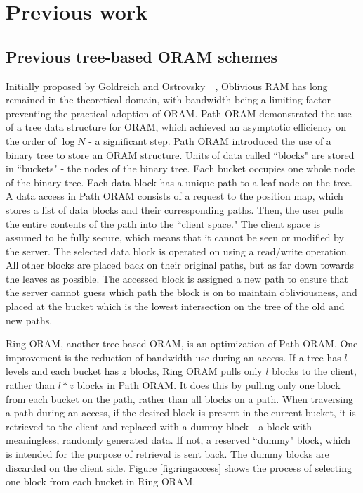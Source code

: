 \documentclass[12pt, oneside]{article}   	%
\begin{document}
\section{Previous work}

\subsection{Previous tree-based ORAM schemes}
Initially proposed by Goldreich and Ostrovsky~\cite{gold}~\cite{goldostrov}, Oblivious RAM has long remained in the theoretical domain, with bandwidth being a limiting factor preventing the practical adoption of ORAM. Path ORAM demonstrated the use of a tree data structure for ORAM, which achieved an asymptotic efficiency on the order of $\log N$ - a significant step. Path ORAM introduced the use of a binary tree to store an ORAM structure. Units of data called ``blocks" are stored in ``buckets" - the nodes of the binary tree. Each bucket occupies one whole node of the binary tree. Each data block has a unique path to a leaf node on the tree. A data access in Path ORAM consists of a request to the position map, which stores a list of data blocks and their corresponding paths. Then, the user pulls the entire contents of the path into the ``client space." The client space is assumed to be fully secure, which means that it cannot be seen or modified by the server. The selected data block is operated on using a read/write operation. All other blocks are placed back on their original paths, but as far down towards the leaves as possible. The accessed block is assigned a new path to ensure that the server cannot guess which path the block is on to maintain obliviousness, and placed at the bucket which is the lowest intersection on the tree of the old and new paths. 

Ring ORAM, another tree-based ORAM, is an optimization of Path ORAM. One improvement is the reduction of bandwidth use during an access. If a tree has $l$ levels and each bucket has $z$ blocks, Ring ORAM pulls only $l$ blocks to the client, rather than $l*z$ blocks in Path ORAM. It does this by pulling only one block from each bucket on the path, rather than all blocks on a path. When traversing a path during an access, if the desired block is present in the current bucket, it is retrieved to the client and replaced with a dummy block - a block with meaningless, randomly generated data. If not, a reserved ``dummy" block, which is intended for the purpose of retrieval is sent back. The dummy blocks are discarded on the client side. Figure \ref{fig:ringaccess} shows the process of selecting one block from each bucket in Ring ORAM.
\end{document}

